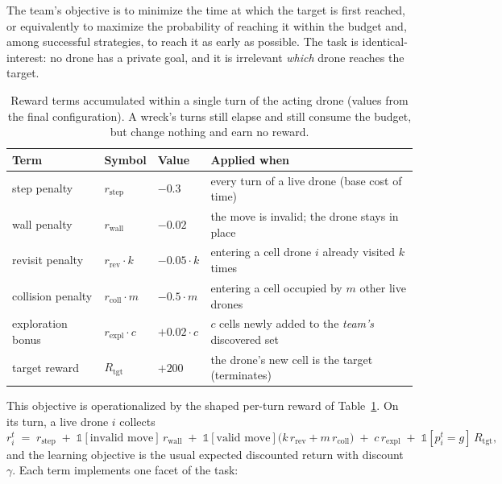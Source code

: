 The team's objective is to minimize the time at which the target is first
reached, or equivalently to maximize the probability of reaching it within the
budget and, among successful strategies, to reach it as early as possible. The
task is identical-interest: no drone has a private goal, and it is irrelevant
\emph{which} drone reaches the target.

\begin{table}[t]
\centering
\small
\begin{tabular}{llll}
\toprule
\textbf{Term} & \textbf{Symbol} & \textbf{Value} & \textbf{Applied when} \\
\midrule
step penalty & $r_{\mathrm{step}}$ & $-0.3$ & every turn of a live drone (base cost of time) \\
wall penalty & $r_{\mathrm{wall}}$ & $-0.02$ & the move is invalid; the drone stays in place \\
revisit penalty & $r_{\mathrm{rev}} \cdot k$ & $-0.05 \cdot k$ & entering a cell drone $i$ already visited $k$ times \\
collision penalty & $r_{\mathrm{coll}} \cdot m$ & $-0.5 \cdot m$ & entering a cell occupied by $m$ other live drones \\
exploration bonus & $r_{\mathrm{expl}} \cdot c$ & $+0.02 \cdot c$ & $c$ cells newly added to the \emph{team's} discovered set \\
target reward & $R_{\mathrm{tgt}}$ & $+200$ & the drone's new cell is the target (terminates) \\
\bottomrule
\end{tabular}
\caption{Reward terms accumulated within a single turn of the acting drone
(values from the final configuration). A wreck's turns still elapse and still
consume the budget, but change nothing and earn no reward.}
\label{tab:reward}
\end{table}

This objective is operationalized by the shaped per-turn reward of
Table~\ref{tab:reward}. On its turn, a live drone $i$ collects
\[
r_i^t \;=\; r_{\mathrm{step}}
\;+\; \mathbb{1}[\text{invalid move}]\, r_{\mathrm{wall}}
\;+\; \mathbb{1}[\text{valid move}] \bigl( k \, r_{\mathrm{rev}} + m \, r_{\mathrm{coll}} \bigr)
\;+\; c \, r_{\mathrm{expl}}
\;+\; \mathbb{1}[p_i^{t} = g]\, R_{\mathrm{tgt}} ,
\]
and the learning objective is the usual expected discounted return with discount
$\gamma$. Each term implements one facet of the task:

